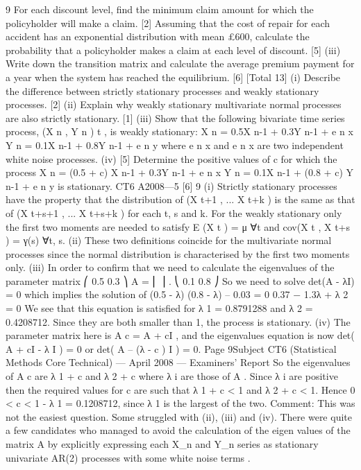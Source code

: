 9
For each discount level, find the minimum claim amount for which the
policyholder will make a claim. [2]
Assuming that the cost of repair for each accident has an exponential
distribution with mean £600, calculate the probability that a policyholder
makes a claim at each level of discount. [5]
(iii) Write down the transition matrix and calculate the average premium payment
for a year when the system has reached the equilibrium.
[6]
[Total 13]
(i) Describe the difference between strictly stationary processes and weakly
stationary processes.
[2]
(ii) Explain why weakly stationary multivariate normal processes are also strictly
stationary.
[1]
(iii) Show that the following bivariate time series process, (X n , Y n ) t , is weakly
stationary:
X n = 0.5X n-1 + 0.3Y n-1 + e n x
Y n = 0.1X n-1 + 0.8Y n-1 + e n y
where e n x and e n x are two independent white noise processes.
(iv)
[5]
Determine the positive values of c for which the process
X n = (0.5 + c) X n-1 + 0.3Y n-1 + e n x
Y n = 0.1X n-1 + (0.8 + c) Y n-1 + e n y
is stationary.
CT6 A2008—5
[6]
9
(i)
Strictly stationary processes have the property that the distribution of
(X t+1 , ... X t+k ) is the same as that of (X t+s+1 , ... X t+s+k ) for each t, s and k. For
the weakly stationary only the first two moments are needed to satisfy
E (X t ) = μ ∀t
and
cov(X t , X t+s ) = γ(s)
∀t, s.
(ii) These two definitions coincide for the multivariate normal processes since the
normal distribution is characterised by the first two moments only.
(iii) In order to confirm that we need to calculate the eigenvalues of the parameter
matrix
⎛ 0.5 0.3 ⎞
A = ⎜
⎟ .
⎝ 0.1 0.8 ⎠
So we need to solve det(A - λI) = 0 which implies the solution of
(0.5 - λ) (0.8 - λ) – 0.03 = 0
0.37 − 1.3λ + λ 2 = 0
We see that this equation is satisfied for λ 1 = 0.8791288 and λ 2 = 0.4208712.
Since they are both smaller than 1, the process is stationary.
(iv)
The parameter matrix here is A c = A + cI , and the eigenvalues equation is now
det( A + cI - λ I ) = 0 or det( A – (λ - c ) I ) = 0.
Page 9Subject CT6 (Statistical Methods Core Technical) — April 2008 — Examiners’ Report
So the eigenvalues of A c are λ 1 + c and λ 2 + c where λ i are those of A .
Since λ i are positive then the required values for c are such that λ 1 + c < 1 and
λ 2 + c < 1.
Hence 0 < c < 1 - λ 1 = 0.1208712, since λ 1 is the largest of the two.
Comment: This was not the easiest question. Some struggled with (ii), (iii) and (iv).
There were quite a few candidates who managed to avoid the calculation of the eigen
values of the matrix A by explicitly expressing each X_n and Y_n series as stationary
univariate AR(2) processes with some white noise terms .

